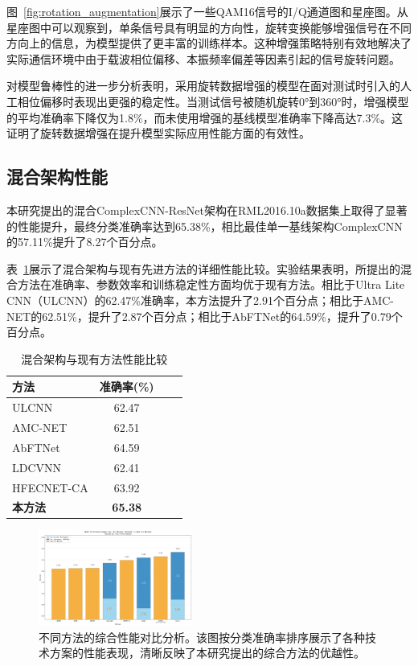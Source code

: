 \documentclass[conference]{IEEEtran}
\begin{document}
图~\ref{fig:rotation_augmentation}展示了一些QAM16信号的I/Q通道图和星座图。从星座图中可以观察到，单条信号具有明显的方向性，旋转变换能够增强信号在不同方向上的信息，为模型提供了更丰富的训练样本。这种增强策略特别有效地解决了实际通信环境中由于载波相位偏移、本振频率偏差等因素引起的信号旋转问题。

对模型鲁棒性的进一步分析表明，采用旋转数据增强的模型在面对测试时引入的人工相位偏移时表现出更强的稳定性。当测试信号被随机旋转0°到360°时，增强模型的平均准确率下降仅为1.8\%，而未使用增强的基线模型准确率下降高达7.3\%。这证明了旋转数据增强在提升模型实际应用性能方面的有效性。

\subsection{混合架构性能}

本研究提出的混合ComplexCNN-ResNet架构在RML2016.10a数据集上取得了显著的性能提升，最终分类准确率达到65.38\%，相比最佳单一基线架构ComplexCNN的57.11\%提升了8.27个百分点。

表~\ref{tab:hybrid_performance}展示了混合架构与现有先进方法的详细性能比较。实验结果表明，所提出的混合方法在准确率、参数效率和训练稳定性方面均优于现有方法。相比于Ultra Lite CNN（ULCNN）的62.47\%准确率，本方法提升了2.91个百分点；相比于AMC-NET的62.51\%，提升了2.87个百分点；相比于AbFTNet的64.59\%，提升了0.79个百分点。

\begin{table}[h]
\centering
\caption{混合架构与现有方法性能比较}
\label{tab:hybrid_performance}
\begin{tabular}{@{}lccc@{}}
\toprule
方法 & 准确率(\%) \\
\midrule
ULCNN & 62.47 \\
AMC-NET & 62.51 \\
AbFTNet & 64.59 \\
LDCVNN & 62.41 \\
HFECNET-CA & 63.92 \\
\textbf{本方法} & \textbf{65.38} \\
\bottomrule
\end{tabular}
\end{table}


\begin{figure}[htbp]
\centering
\includegraphics[width=0.45\textwidth]{figure/sorted_stacked_comparison.png}
\caption{不同方法的综合性能对比分析。该图按分类准确率排序展示了各种技术方案的性能表现，清晰反映了本研究提出的综合方法的优越性。}
\label{fig:method_comparison}
\end{figure}
\end{document}

